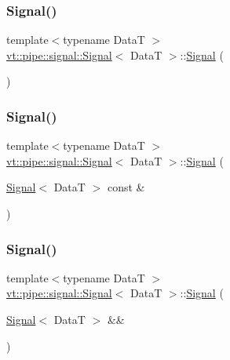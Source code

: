 \subsubsection{\texorpdfstring{Signal()}{Signal()}\hspace{0.1cm}{\footnotesize\ttfamily [1/5]}}
{\footnotesize\ttfamily template$<$typename DataT $>$ \\
\hyperlink{structvt_1_1pipe_1_1signal_1_1_signal}{vt\+::pipe\+::signal\+::\+Signal}$<$ DataT $>$\+::\hyperlink{structvt_1_1pipe_1_1signal_1_1_signal}{Signal} (\begin{DoxyParamCaption}{ }\end{DoxyParamCaption})\hspace{0.3cm}{\ttfamily [default]}}

\mbox{\label{structvt_1_1pipe_1_1signal_1_1_signal_a5fba0db3ce0cb3e202ab3c5b7e3e2afa}} 
\subsubsection{\texorpdfstring{Signal()}{Signal()}\hspace{0.1cm}{\footnotesize\ttfamily [2/5]}}
{\footnotesize\ttfamily template$<$typename DataT $>$ \\
\hyperlink{structvt_1_1pipe_1_1signal_1_1_signal}{vt\+::pipe\+::signal\+::\+Signal}$<$ DataT $>$\+::\hyperlink{structvt_1_1pipe_1_1signal_1_1_signal}{Signal} (\begin{DoxyParamCaption}\item[{\hyperlink{structvt_1_1pipe_1_1signal_1_1_signal}{Signal}$<$ DataT $>$ const \&}]{ }\end{DoxyParamCaption})\hspace{0.3cm}{\ttfamily [default]}}

\mbox{\label{structvt_1_1pipe_1_1signal_1_1_signal_aae63474ae7444649579948a543d5281a}} 
\subsubsection{\texorpdfstring{Signal()}{Signal()}\hspace{0.1cm}{\footnotesize\ttfamily [3/5]}}
{\footnotesize\ttfamily template$<$typename DataT $>$ \\
\hyperlink{structvt_1_1pipe_1_1signal_1_1_signal}{vt\+::pipe\+::signal\+::\+Signal}$<$ DataT $>$\+::\hyperlink{structvt_1_1pipe_1_1signal_1_1_signal}{Signal} (\begin{DoxyParamCaption}\item[{\hyperlink{structvt_1_1pipe_1_1signal_1_1_signal}{Signal}$<$ DataT $>$ \&\&}]{ }\end{DoxyParamCaption})\hspace{0.3cm}{\ttfamily [default]}}

